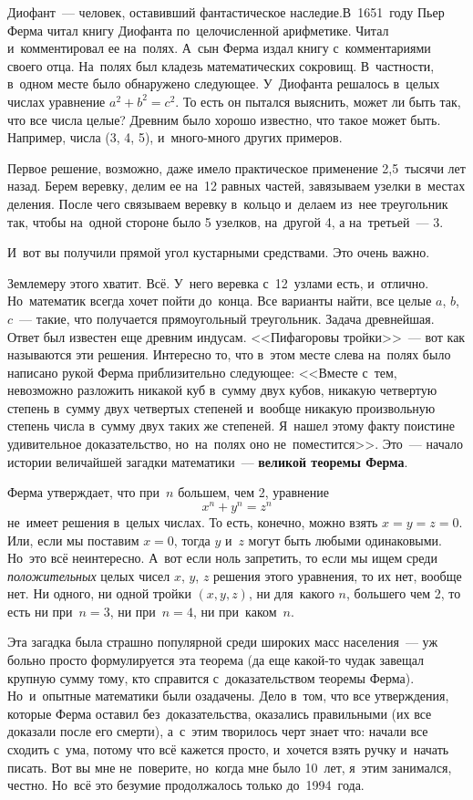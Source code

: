 Диофант~--- человек, оставивший фантастическое наследие.\linebreak В~1651~году Пьер Ферма читал книгу
Диофанта по~целочисленной арифметике. Читал и~комментировал ее на~полях. А~сын Ферма издал книгу
с~комментариями своего отца. На~полях был кладезь математических сокровищ. В~частности, в~одном месте было обнаружено следующее.
У~Диофанта решалось в~целых числах уравнение $a^{2}+b^{2}=c^{2}$. То есть он пытался
выяснить, может ли быть так, что все числа целые? Древним было хорошо известно, что такое может
быть. Например, числа (3, 4, 5), и~много-много других примеров.

Первое решение, возможно, даже имело практическое применение 2,5~тысячи лет назад. Берем веревку, делим ее на~12
равных частей, завязываем узелки в~местах деления. После чего связываем веревку в~кольцо и~делаем
из~нее треугольник так, чтобы на~одной стороне было 5 узелков, на~другой 4, а на~третьей~--- 3.


И~вот вы получили прямой угол кустарными средствами. Это очень важно.

Землемеру этого хватит. Всё. У~него веревка с~12~узлами есть, и~отлично. Но~математик всегда хочет
пойти до~конца. Все варианты найти, все целые $a$, $b$, $c$~--- такие, что получается прямоугольный
треугольник. Задача древнейшая. Ответ был известен еще древним индусам. <<Пифагоровы тройки>>~---
вот как называются эти решения. Интересно то, что в~этом месте слева на~полях было написано рукой
Ферма приблизительно следующее: <<Вместе с~тем, невозможно разложить никакой куб в~сумму двух
кубов, никакую четвертую степень в~сумму двух четвертых степеней и~вообще никакую произвольную
степень числа в~сумму двух таких же степеней. Я~нашел этому факту поистине удивительное
доказательство, но~на~полях оно не~поместится>>. Это~--- начало истории величайшей загадки
математики~--- \textbf{великой теоремы Ферма}.

Ферма утверждает, что при~$n$ большем, чем 2, уравнение $$x^{n}+y^{n} = z^{n}$$ не~имеет решения в~целых числах.
То есть, конечно, можно взять $x=y=z=0$. Или, если мы поставим $x=0$, тогда $y$ и~$z$ могут быть любыми
одинаковыми. Но~это всё неинтересно. А~вот если ноль запретить, то если мы ищем среди \textit{положительных}
целых чисел $x$, $y$, $z$ решения этого уравнения, то их нет, вообще нет. Ни одного, ни одной тройки $(x,
y, z)$, ни для~какого $n$, большего чем 2, то есть ни при~$n=3$, ни при~$n=4$, ни при~каком~$n$.

Эта загадка была страшно популярной среди широких масс населения~--- уж больно просто формулируется
эта теорема (да еще какой-то чудак завещал крупную сумму тому, кто справится с~доказательством
теоремы Ферма). Но~и~опытные математики были озадачены. Дело в~том, что все утверждения, которые
Ферма оставил без~доказательства, оказались правильными (их все доказали после его смерти),
а~с~этим творилось черт знает что: начали все сходить с~ума, потому что всё кажется просто,
и~хочется взять ручку и~начать писать. Вот вы мне не~поверите, но~когда мне было 10~лет, я~этим
занимался, честно. Но~всё это безумие продолжалось только до~1994~года.

